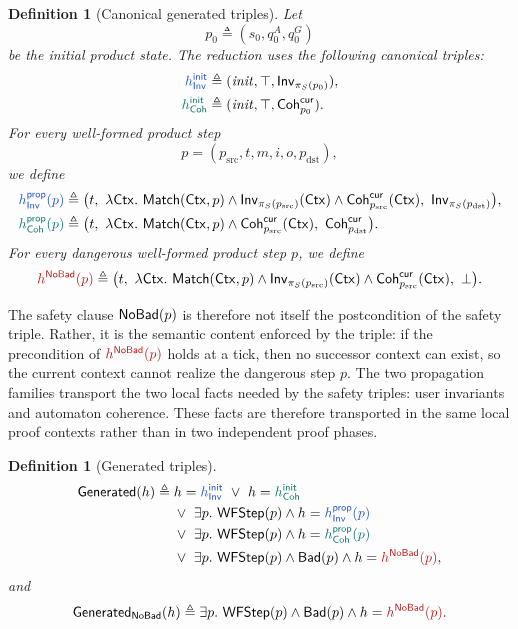 \documentclass[acmsmall,screen]{acmart}
\theoremstyle{leftplain}
\theoremstyle{leftdefinition}
\newtheorem{definition}[theorem]{Definition}
\theoremstyle{leftremark}
\begin{document}
\begin{definition}[Canonical generated triples]
Let
\[
  p_0 \triangleq (s_0,q^A_0,q^G_0)
\]
be the initial product state. The reduction uses the following canonical
triples:
\begin{align*}
  \tripleinv{h^{\mathsf{init}}_{\NodeInv}} &\triangleq
    (\mathit{init},\top,\NodeInv_{\pi_S(p_0)}),\\
  \triplecoh{h^{\mathsf{init}}_{\Coherence}} &\triangleq
    (\mathit{init},\top,\CohCur_{p_0}).
\end{align*}
For every well-formed product step
\[
  p=(p_{\mathrm{src}},t,m,i,o,p_{\mathrm{dst}}),
\]
we define
\begin{align*}
  \tripleinv{h^{\mathsf{prop}}_{\NodeInv}(p)} &\triangleq
    \bigl(
      t,\
      \lambda \Ctx.\ \Match(\Ctx,p)
        \wedge \NodeInv_{\pi_S(p_{\mathrm{src}})}(\Ctx)
        \wedge \CohCur_{p_{\mathrm{src}}}(\Ctx),\
      \NodeInv_{\pi_S(p_{\mathrm{dst}})}
    \bigr),\\
  \triplecoh{h^{\mathsf{prop}}_{\Coherence}(p)} &\triangleq
    \bigl(
      t,\
      \lambda \Ctx.\ \Match(\Ctx,p)\wedge \CohCur_{p_{\mathrm{src}}}(\Ctx),\
      \CohCur_{p_{\mathrm{dst}}}
    \bigr).
\end{align*}
For every dangerous well-formed product step $p$, we define
\[
  \triplesafe{h^{\NoBad}(p)} \triangleq
  \bigl(
    t,\
    \lambda \Ctx.\ \Match(\Ctx,p)
      \wedge \NodeInv_{\pi_S(p_{\mathrm{src}})}(\Ctx)
      \wedge \CohCur_{p_{\mathrm{src}}}(\Ctx),\
    \bot
  \bigr).
\]
\end{definition}

The safety clause $\mathsf{NoBad}(p)$ is therefore not itself the postcondition of the
safety triple. Rather, it is the semantic content enforced by the triple: if
the precondition of $\triplesafe{h^{\NoBad}(p)}$ holds at a tick, then no successor context
can exist, so the current context cannot realize the dangerous step $p$. The
two propagation families transport the two local facts needed by the safety
triples: user invariants and automaton coherence. These facts are therefore
transported in the same local proof contexts rather than in two independent
proof phases.

\begin{definition}[Generated triples]
\begin{align*}
  \Generated(h) \triangleq{}&
    h = \tripleinv{h^{\mathsf{init}}_{\NodeInv}}
    \ \vee\
    h = \triplecoh{h^{\mathsf{init}}_{\Coherence}}\\
  &\vee\ \exists p.\ \mathsf{WFStep}(p) \wedge h = \tripleinv{h^{\mathsf{prop}}_{\NodeInv}(p)}\\
  &\vee\ \exists p.\ \mathsf{WFStep}(p) \wedge h = \triplecoh{h^{\mathsf{prop}}_{\Coherence}(p)}\\
  &\vee\ \exists p.\ \mathsf{WFStep}(p) \wedge \Bad(p) \wedge h = \triplesafe{h^{\NoBad}(p)},
\end{align*}
and
\[
  \Generated_{\NoBad}(h) \triangleq
  \exists p.\ \mathsf{WFStep}(p) \wedge \Bad(p) \wedge h = \triplesafe{h^{\NoBad}(p)}.
\]
\end{definition}
\end{document}
